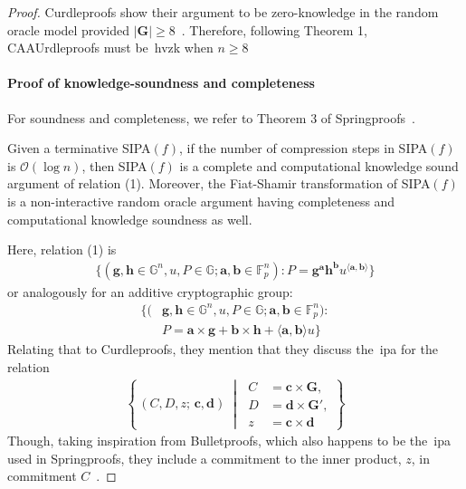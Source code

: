 \begin{proof}
    Curdleproofs show their argument to be zero-knowledge in the random oracle model provided $|\mathbf{G}|\geq8$~\cite{Curdleproofs}.
    Therefore, following Theorem 1, CAAUrdleproofs must be~\gls{hvzk} when $n\geq8$

    \paragraph*{\textbf{Proof of knowledge-soundness and completeness}}
    For soundness and completeness, we refer to Theorem 3 of Springproofs~\cite{zhang2024springproofs}.
    \begin{theorem}
        Given a terminative SIPA$(f)$, if the number of compression steps in SIPA$(f)$ is $\mathcal{O}(\log n)$, then SIPA$(f)$ is a complete and computational knowledge sound argument of relation (1).
        Moreover, the Fiat-Shamir transformation of SIPA$(f)$ is a non-interactive random oracle argument having completeness and computational knowledge soundness as well.
    \end{theorem}
    Here, relation (1) is
    \begin{align}
        \{(\mathbf{g},\mathbf{h}\in\mathbb{G}^n,u,P\in\mathbb{G};\mathbf{a},\mathbf{b}\in\mathbb{F}_p^n):P=\mathbf{g}^\mathbf{a}\mathbf{h}^\mathbf{b}u^{\langle \mathbf{a},\mathbf{b}\rangle}\}
    \end{align}
    or analogously for an additive cryptographic group:
    \begin{align}
        \{(&\mathbf{g},\mathbf{h}\in\mathbb{G}^n,u,P\in\mathbb{G};\mathbf{a},\mathbf{b}\in\mathbb{F}_p^n):\\
        &P=\mathbf{a}\times\mathbf{g}+\mathbf{b}\times\mathbf{h}+\langle \mathbf{a},\mathbf{b}\rangle u\}\label{al:P}
    \end{align}
    Relating that to Curdleproofs, they mention that they discuss the~\gls{ipa} for the relation
    \begin{align}
        \left\{
        \,(C,D,z;\,\mathbf{c},\mathbf{d})\;\middle|\;
        \begin{aligned}
            C &= \mathbf{c} \times \mathbf{G},\\
            D &= \mathbf{d} \times \mathbf{G'},\\
            z &= \mathbf{c} \times \mathbf{d}
        \end{aligned}
        \right\}
    \end{align}
    Though, taking inspiration from Bulletproofs, which also happens to be the~\gls{ipa} used in Springproofs, they include a commitment to the inner product, $z$, in commitment $C$~\cite{bunz2018bulletproofs}.

\end{proof}
